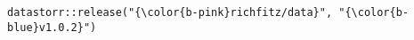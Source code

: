 \documentclass[class=minimal,border=0]{standalone}
\begin{document}
%
\begin{BVerbatim}[bgcolor=b-darkgrey]
datastorr::release("{\color{b-pink}richfitz/data}", "{\color{b-blue}v1.0.2}")
\end{BVerbatim}
\end{document}
